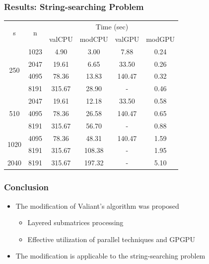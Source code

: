 \documentclass[xcolor=table]{beamer}
\begin{document}
\begin{frame}
\frametitle{Results: String-searching Problem}
    
    
    \begin{center}
        \begin{tabular}{ ||c||c||c|c||c|c|| } 
        \hline
        \multirow{2}{*}{s}& \multirow{2}{*}{n} & \multicolumn{4}{c||}{Time (sec)}\\
        & & valCPU & modCPU & valGPU & modGPU \\
        \hline
        \multirow{4}{*}{250} & 1023 & 4.90 & 3.00 & 7.88 & 0.24 \\ 
        & 2047 & 19.61 & 6.65 & 33.50 & 0.26\\ 
        & 4095 & 78.36 & 13.83 & 140.47 & 0.32\\ 
        & 8191 & 315.67 & 28.90 & - & 0.46\\ 
        \hline
        \multirow{3}{*}{510} & 2047 & 19.61 & 12.18 & 33.50 & 0.58\\
        & 4095 & 78.36 & 26.58 & 140.47 & 0.65\\
        & 8191 & 315.67 & 56.70 & -  & 0.88\\ 
        \hline
        \multirow{2}{*}{1020} & 4095 & 78.36 & 48.31 & 140.47 & 1.59 \\
        & 8191 & 315.67 & 108.38 & - & 1.95\\ 
        \hline
        2040 & 8191 & 315.67 & 197.32 & - & 5.10\\ 
        \hline
        \end{tabular}
    \end{center}
    

\end{frame}


\begin{frame}[fragile] \frametitle{Conclusion}
    \begin{itemize}
        \item The modification of Valiant's algorithm was proposed
        \begin{itemize}
            \item Layered submatrices processing
            \item Effective utilization of parallel techniques and GPGPU
        \end{itemize}
        \item The modification is applicable to the string-searching problem
    \end{itemize}
\end{frame}
\end{document}
